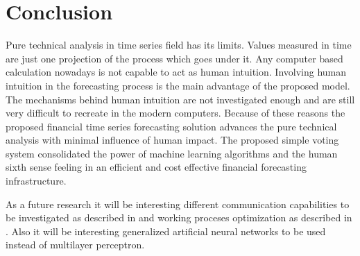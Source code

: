 \documentclass[runningheads]{llncs}
\begin{document}
\section{Conclusion} \label{Conclusion}

Pure technical analysis in time series field has its limits. Values measured in time are just one projection of the process which goes under it. Any computer based calculation nowadays is not capable to act as human intuition. Involving human intuition in the forecasting process is the main advantage of the proposed model. The mechanisms behind human intuition are not investigated enough and are still very difficult to recreate in the modern computers. Because of these reasons the proposed financial time series forecasting solution advances the pure technical analysis with minimal influence of human impact. The proposed simple voting system consolidated the power of machine learning algorithms and the human sixth sense feeling in an efficient and cost effective financial forecasting infrastructure.

As a future research it will be interesting different communication capabilities to be investigated as described in \cite{alexandrov01} and working proceses optimization as described in \cite{atanasov01}. Also it will be interesting generalized artificial neural networks \cite{tashev01} to be used instead of multilayer perceptron.
\end{document}
